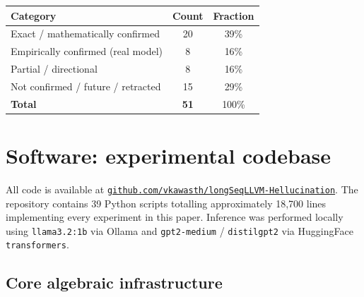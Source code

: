\documentclass[11pt]{amsart}
\theoremstyle{definition}
\begin{document}
\begin{center}
\renewcommand{\arraystretch}{1.3}
\begin{tabular}{@{}lcc@{}}
\toprule
Category & Count & Fraction \\
\midrule
Exact / mathematically confirmed & 20 & 39\% \\
Empirically confirmed (real model) & 8 & 16\% \\
Partial / directional & 8 & 16\% \\
Not confirmed / future / retracted & 15 & 29\% \\
\midrule
\textbf{Total} & \textbf{51} & 100\% \\
\bottomrule
\end{tabular}
\end{center}

\section{Software: experimental codebase}
\label{sec:software}

All code is available at
\href{https://github.com/vkawasth/longSeqLLVM-Hellucination}%
{\texttt{github.com/vkawasth/longSeqLLVM-Hellucination}}.
The repository contains 39 Python scripts totalling approximately
18,700 lines implementing every experiment in this paper.
Inference was performed locally using \texttt{llama3.2:1b} via Ollama
and \texttt{gpt2-medium} / \texttt{distilgpt2} via HuggingFace
\texttt{transformers}.

\subsection{Core algebraic infrastructure}
\end{document}
